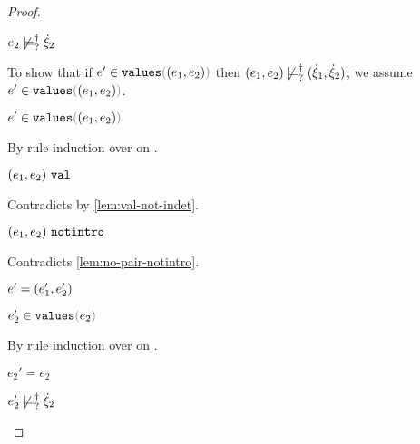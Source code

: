 \begin{proof}
\begin{byCases}
\begin{byCases}
\begin{byCases}
\begin{pfsteps*}
        \item $e_2 \not\models_{?}^{\dag} \dot{\xi}_2$  
        \end{pfsteps*}
        To show that if $\inValues{e'}{\hpair{e_1}{e_2}}$ then $(e_1 , e_2) \not\models_{?}^{\dag} (\dot{\xi}_1 , \dot{\xi}_2)$, we assume $\inValues{e'}{\hpair{e_1}{e_2}}$.
        \begin{pfsteps*}
        \item $\inValues{e'}{\hpair{e_1}{e_2}}$  
        \end{pfsteps*}
        By rule induction over  on .
        \begin{byCases}
          \item[\text{(\ref{rule:IVVal})}]
          \begin{pfsteps*}
          \item $(e_1 , e_2) ~\mathtt{val}$ 
          \end{pfsteps*} 
          Contradicts  by \autoref{lem:val-not-indet}.
          \item[\text{(\ref{rule:IVIndet})}] 
          \begin{pfsteps*}
          \item $(e_1 , e_2) ~\mathtt{notintro}$ 
          \end{pfsteps*}
          Contradicts \autoref{lem:no-pair-notintro}.
          \item[\text{(\ref{rule:IVPair})}]
          \begin{pfsteps*}
          \item $e'=(e_1' , e_2')$ 
          \item $\inValues{e_2'}{e_2}$  
          \end{pfsteps*}
          By rule induction over  on .
          \begin{byCases}
            \item[\text{(\ref{rule:IVVal})}]
            \begin{pfsteps*}
            \item $e_2'=e_2$  
            \item $e_2' \not\models_{?}^{\dag} \dot{\xi}_2$  

\end{pfsteps*}
\end{byCases}
\end{byCases}
\end{byCases}
\end{byCases}
\end{byCases}
\end{proof}
